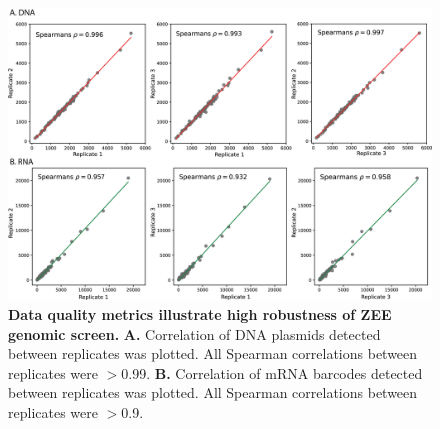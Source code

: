 \begin{figure}[p]
    \centering
    \includegraphics[scale=.75]{2_figures/FigS2_Data-QC.png}
    \caption[Data quality metrics illustrate high robustness of ZEE genomic screen]{\textbf{Data quality metrics illustrate high robustness of ZEE genomic screen.} \textbf{A.} Correlation of DNA plasmids detected between replicates was plotted. All Spearman correlations between replicates were $>$0.99. \textbf{B.} Correlation of mRNA barcodes detected between replicates was plotted. All Spearman correlations between replicates were $>$0.9.}
    \label{fig:supplement notochord data qc}
\end{figure}

